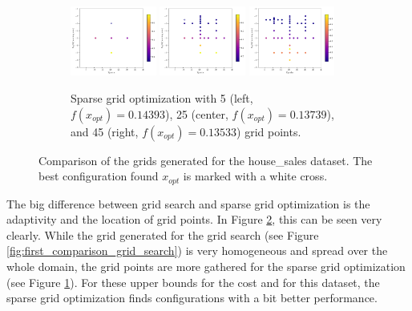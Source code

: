 \begin{figure}[H]
\begin{subfigure}{\textwidth}
		\centering
		\includegraphics[width=0.31\textwidth]{figures/Results/First_comparison/Sparse8}
		\includegraphics[width=0.31\textwidth]{figures/Results/First_comparison/Sparse28}
		\includegraphics[width=0.31\textwidth]{figures/Results/First_comparison/Sparse48}
		\caption{ Sparse grid optimization with 5 (left, $f(x_{opt}) = 0.14393$), 25 (center, $f(x_{opt}) = 0.13739$), and 45 (right, $f(x_{opt}) = 0.13533$) grid points. }
		\label{fig:first_comparison_sparse_optimization}
	\end{subfigure}
	
	\caption{ Comparison of the grids generated for the house\_sales dataset. The best configuration found $ x_{opt} $ is marked with a white cross.}
	\label{fig:Comparison_visualization}
\end{figure}

The big difference between grid search and sparse grid optimization is the adaptivity and the location of grid points. In Figure \ref{fig:Comparison_visualization}, this can be seen very clearly. While the grid generated for the grid search (see Figure \ref{fig:first_comparison_grid_search}) is very homogeneous and spread over the whole domain, the grid points are more gathered for the sparse grid optimization (see Figure \ref{fig:first_comparison_sparse_optimization}). For these upper bounds for the cost and for this dataset, the sparse grid optimization finds configurations with a bit better performance.


